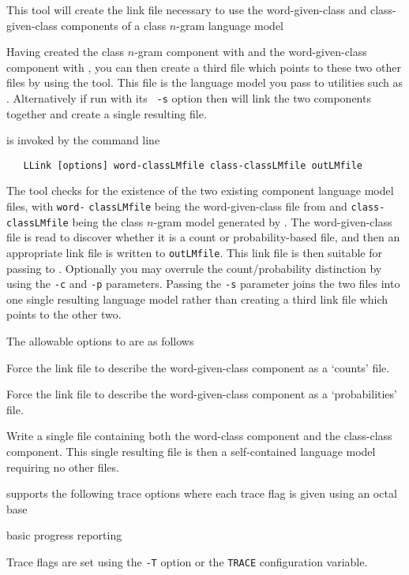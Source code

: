 %
%

\newpage
{}


This tool will create the link file necessary to use the word-given-class and
class-given-class components of a class $n$-gram language model

Having created the class $n$-gram component with  and
the word-given-class component with , you can then
create a third file which points to these two other files by using the
 tool.  This file is the language model you pass to
utilities such as .  Alternatively if run with its {\tt
-s} option then  will link the two components together
and create a single resulting file.



 is invoked by the command line
\begin{verbatim}
   LLink [options] word-classLMfile class-classLMfile outLMfile
\end{verbatim}
The tool checks for the existence of the two existing component
language model files, with {\tt word-} {\tt classLMfile} being the
word-given-class file from  and {\tt class-classLMfile}
being the class $n$-gram model generated by .  The
word-given-class file is read to discover whether it is a count or
probability-based file, and then an appropriate link file is written
to {\tt outLMfile}.  This link file is then suitable for passing to
.  Optionally you may overrule the count/probability
distinction by using the {\tt -c} and {\tt -p} parameters.  Passing
the {\tt -s} parameter joins the two files into one single resulting
language model rather than creating a third link file which points to
the other two.

The allowable options to  are as follows
\begin{optlist}
   Force the link file to describe the word-given-class
        component as a `counts' file.

   Force the link file to describe the word-given-class
        component as a `probabilities' file.

   Write a single file containing both the word-class
        component and the class-class component.  This single
        resulting file is then a self-contained language model
        requiring no other files.

\end{optlist}


 supports the following trace options where each trace flag is 
given using an octal base
\begin{optlist}
    basic progress reporting
\end{optlist}
Trace flags are set using the \texttt{-T} option or the \texttt{TRACE}
configuration variable.
